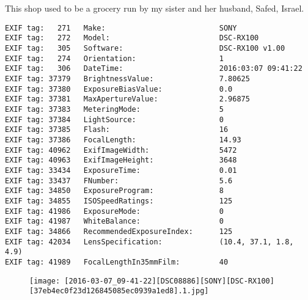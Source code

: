 \section{\protect{}}
\noindent This shop used to be a grocery run by my sister and her husband, Safed, Israel.
\noindent
\begin{lstlisting}
EXIF tag:   271   Make:                          SONY
EXIF tag:   272   Model:                         DSC-RX100
EXIF tag:   305   Software:                      DSC-RX100 v1.00
EXIF tag:   274   Orientation:                   1
EXIF tag:   306   DateTime:                      2016:03:07 09:41:22
EXIF tag: 37379   BrightnessValue:               7.80625
EXIF tag: 37380   ExposureBiasValue:             0.0
EXIF tag: 37381   MaxApertureValue:              2.96875
EXIF tag: 37383   MeteringMode:                  5
EXIF tag: 37384   LightSource:                   0
EXIF tag: 37385   Flash:                         16
EXIF tag: 37386   FocalLength:                   14.93
EXIF tag: 40962   ExifImageWidth:                5472
EXIF tag: 40963   ExifImageHeight:               3648
EXIF tag: 33434   ExposureTime:                  0.01
EXIF tag: 33437   FNumber:                       5.6
EXIF tag: 34850   ExposureProgram:               8
EXIF tag: 34855   ISOSpeedRatings:               125
EXIF tag: 41986   ExposureMode:                  0
EXIF tag: 41987   WhiteBalance:                  0
EXIF tag: 34866   RecommendedExposureIndex:      125
EXIF tag: 42034   LensSpecification:             (10.4, 37.1, 1.8, 4.9)
EXIF tag: 41989   FocalLengthIn35mmFilm:         40

\end{lstlisting}
\clearpage
\begin{figure}
\raggedleft
\texttt{[image: [2016-03-07\_09-41-22][DSC08886][SONY][DSC-RX100][37eb4ec0f23d126845085ec0939a1ed8].1.jpg]}
\end{figure}


\clearpage
